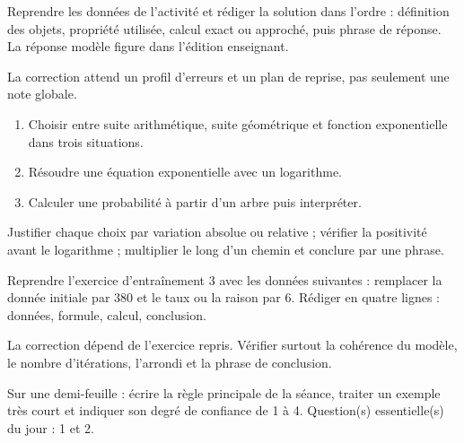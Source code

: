 \begin{example}
Reprendre les données de l'activité et rédiger la solution dans l'ordre : définition des objets, propriété utilisée, calcul exact ou approché, puis phrase de réponse. La réponse modèle figure dans l'édition enseignant.
\end{example}
\begin{solution}La correction attend un profil d'erreurs et un plan de reprise, pas seulement une note globale.\end{solution}

\begin{exercise}[essentiel]
\begin{enumerate}\item Choisir entre suite arithmétique, suite géométrique et fonction exponentielle dans trois situations.\item Résoudre une équation exponentielle avec un logarithme.\item Calculer une probabilité à partir d'un arbre puis interpréter.\end{enumerate}
\end{exercise}
\begin{solution}Justifier chaque choix par variation absolue ou relative ; vérifier la positivité avant le logarithme ; multiplier le long d'un chemin et conclure par une phrase.\end{solution}


\begin{homework}Reprendre l'exercice d'entraînement 3 avec les données suivantes : remplacer la donnée initiale par $380$ et le taux ou la raison par $6$. Rédiger en quatre lignes : données, formule, calcul, conclusion.\end{homework}
\begin{solution}La correction dépend de l'exercice repris. Vérifier surtout la cohérence du modèle, le nombre d'itérations, l'arrondi et la phrase de conclusion.\end{solution}

\begin{exitticket}[3 minutes]Sur une demi-feuille : écrire la règle principale de la séance, traiter un exemple très court et indiquer son degré de confiance de 1 à 4. Question(s) essentielle(s) du jour : 1 et 2.\end{exitticket}

